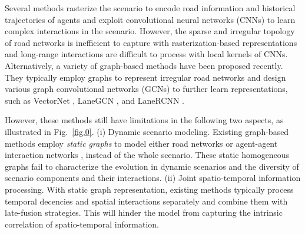 \documentclass[letterpaper, 10 pt, conference]{ieeeconf}
\begin{document}
Several methods \cite{chai2019multipath,cui2019multimodal,bansal2018chauffeurnet,casas2018intentnet,hong2019rules} rasterize the scenario to encode road information and historical trajectories of agents and exploit convolutional neural networks (CNNs) to learn complex interactions in the scenario. However, the sparse and irregular topology of road networks is inefficient to capture with rasterization-based representations  and long-range interactions are difficult to process with local kernels of CNNs.  Alternatively, a variety of graph-based methods \cite{gao2020vectornet,liang2020learning,zeng2021lanercnn,gilles2021gohome,mo2022multi} have been  proposed recently. They typically employ graphs to represent irregular road networks and design various graph convolutional networks (GCNs) to further learn representations, such as VectorNet \cite{gao2020vectornet}, LaneGCN \cite{liang2020learning}, and LaneRCNN \cite{zeng2021lanercnn}.

However, these methods still have limitations in the following two aspects, as illustrated in Fig.~\ref{fig.0}. (i) Dynamic scenario modeling. Existing graph-based methods employ \textit{static graphs} to model either road networks \cite{liang2020learning,zeng2021lanercnn,gilles2021gohome} or agent-agent interaction networks \cite{mo2022multi}, instead of the whole scenario. These static homogeneous graphs fail to characterize the evolution in dynamic scenarios and 
the diversity of scenario components and their interactions. (ii) Joint spatio-temporal information processing.  With static graph representation, existing methods  typically process temporal decencies and  spatial interactions separately and combine them with late-fusion strategies. This will hinder the model from capturing the intrinsic correlation of spatio-temporal information.
\end{document}
